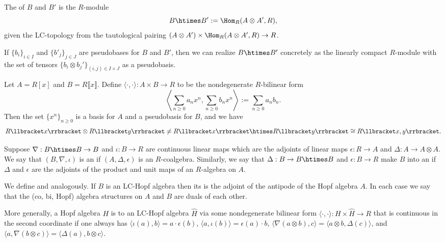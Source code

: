 \begin{definition}
The  of $B$ and $B'$ 
is the $R$-module 
\[B \htimes B' := \Hom_R(A\otimes A',R),\]
given the LC-topology from the tautological pairing 
$(A\otimes A') \times \Hom_R(A\otimes A',R) \to R$.
\end{definition}

If $\{b_i\}_{i \in I}$ and $\{b'_j \}_{j \in J}$ are pseudobases for $B$ and $B'$,
then we can realize $B\htimes B'$ concretely as the linearly compact $R$-module
with the set of tensors $\{ b_i \otimes b_j'\}_{(i,j) \in I \times J}$ as a pseudobasis.



 \begin{example}\label{lc-ex0}
Let $A = R[x]$ and $B=R\llbracket x \rrbracket$.
Define $\langle\cdot,\cdot\rangle : A \times B \to R$ to be the nondegenerate $R$-bilinear form 
\[\left\langle \sum_{n\geq 0} a_n x^n, \sum_{n \geq 0} b_n x^n\right\rangle := \sum_{n\geq 0} a_n b_n.\]
Then the set $\{x^n\}_{n\geq 0}$ is a basis for $A$ and a pseudobasis for $B$,
and we have \[R\llbracket x \rrbracket \otimes R\llbracket y \rrbracket \neq R\llbracket x \rrbracket\htimes R\llbracket y \rrbracket \cong R\llbracket x,y \rrbracket.\]
\end{example}




\begin{definition}
Suppose $\nabla : B \htimes B \to B$ and $\iota : B \to R$ are continuous linear maps
which are the adjoints of linear maps $\epsilon : R \to A$ and $\Delta : A \to A \otimes A$.
We say that $(B,\nabla,\iota)$ is an 
if $(A,\Delta,\epsilon)$ is an $R$-coalgebra.
Similarly, we say that 
$\Delta : B \to B\htimes B$ and $\epsilon : B \to R$ 
make $B$ into an 
if $\Delta$ and $\epsilon$ are the adjoints of the product and unit 
maps of an $R$-algebra on $A$.
 
\end{definition}

We define
 and  analogously.
If $B$ is an LC-Hopf algebra then its  is the adjoint of the antipode of 
the Hopf algebra $A$.
In each case we say that the (co, bi, Hopf) algebra structures on $A$ and $B$ are duals of each other.

More generally, a Hopf algebra $H$ is  to an LC-Hopf algebra $\hat H$ 
via some nondegenerate bilinear form $\langle\cdot,\cdot\rangle : H \times \hat H \to R$ that is continuous in the second coordinate
if one always has $\langle \iota(a), b\rangle = a\cdot \epsilon(b)$, $\langle a, \iota(b)\rangle = \epsilon(a)\cdot b$,
$\langle \nabla(a \otimes b), c\rangle = \langle a\otimes b,\Delta(c)\rangle$,
and 
$\langle a, \nabla(b \otimes c)\rangle = \langle \Delta(a), b\otimes c \rangle$.


